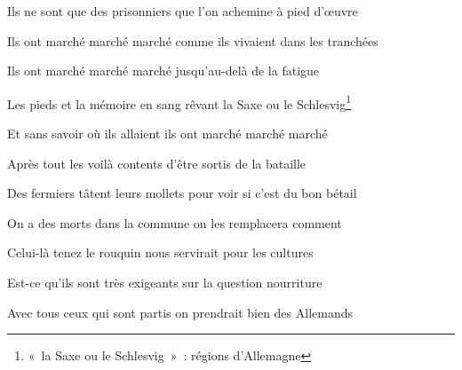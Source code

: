 {Ils ne sont que des prisonniers que l'on achemine à pied d'œuvre

\bigskip

Ils ont marché marché marché comme ils vivaient dans les tranchées

\bigskip

Ils ont marché marché marché jusqu'au-delà de la fatigue

Les pieds et la mémoire en sang rêvant la Saxe ou le Schlesvig\footnote{«~la 
Saxe ou le Schlesvig~»~: régions d'Allemagne}

\bigskip

Et sans savoir où ils allaient ils ont marché marché marché

\bigskip

Après tout les voilà contents d'être sortis de la bataille

Des fermiers tâtent leurs mollets pour voir si c'est du bon bétail

\bigskip

On a des morts dans la commune on les remplacera comment

\bigskip

Celui-là tenez le rouquin nous servirait pour les cultures

Est-ce qu'ils sont très exigeants sur la question nourriture

\bigskip

Avec tous ceux qui sont partis on prendrait bien des Allemands

\setlength{\parskip}{6pt}
}


